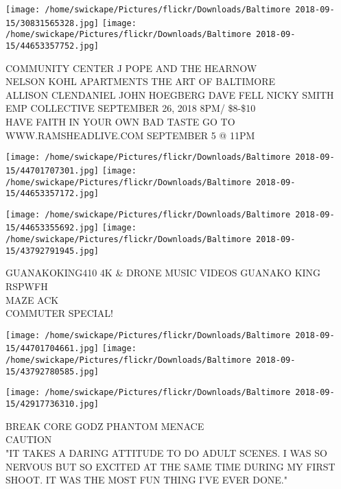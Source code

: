 \documentclass[10pt,letterpaper]{article}
\begin{document}
\texttt{[image: /home/swickape/Pictures/flickr/Downloads/Baltimore 2018-09-15/30831565328.jpg]}
\texttt{[image: /home/swickape/Pictures/flickr/Downloads/Baltimore 2018-09-15/44653357752.jpg]}

COMMUNITY CENTER J POPE AND THE HEARNOW\\
NELSON KOHL APARTMENTS THE ART OF BALTIMORE\\
ALLISON CLENDANIEL JOHN HOEGBERG DAVE FELL NICKY SMITH EMP COLLECTIVE SEPTEMBER 26, 2018 8PM/ \$8{-}\$10\\
HAVE FAITH IN YOUR OWN BAD TASTE GO TO WWW.RAMSHEADLIVE.COM SEPTEMBER 5 @ 11PM
\pagebreak

\texttt{[image: /home/swickape/Pictures/flickr/Downloads/Baltimore 2018-09-15/44701707301.jpg]}
\texttt{[image: /home/swickape/Pictures/flickr/Downloads/Baltimore 2018-09-15/44653357172.jpg]}

\texttt{[image: /home/swickape/Pictures/flickr/Downloads/Baltimore 2018-09-15/44653355692.jpg]}
\texttt{[image: /home/swickape/Pictures/flickr/Downloads/Baltimore 2018-09-15/43792791945.jpg]}

GUANAKOKING410 4K \& DRONE MUSIC VIDEOS GUANAKO KING\\
RSPWFH\\
MAZE ACK\\
COMMUTER SPECIAL!
\pagebreak

\texttt{[image: /home/swickape/Pictures/flickr/Downloads/Baltimore 2018-09-15/44701704661.jpg]}
\texttt{[image: /home/swickape/Pictures/flickr/Downloads/Baltimore 2018-09-15/43792780585.jpg]}

\texttt{[image: /home/swickape/Pictures/flickr/Downloads/Baltimore 2018-09-15/42917736310.jpg]}

BREAK CORE GODZ PHANTOM MENACE\\
CAUTION\\
"IT TAKES A DARING ATTITUDE TO DO ADULT SCENES.  I WAS SO NERVOUS BUT SO EXCITED AT THE SAME TIME DURING MY FIRST SHOOT.  IT WAS THE MOST FUN THING I'VE EVER DONE."
\pagebreak
\end{document}
